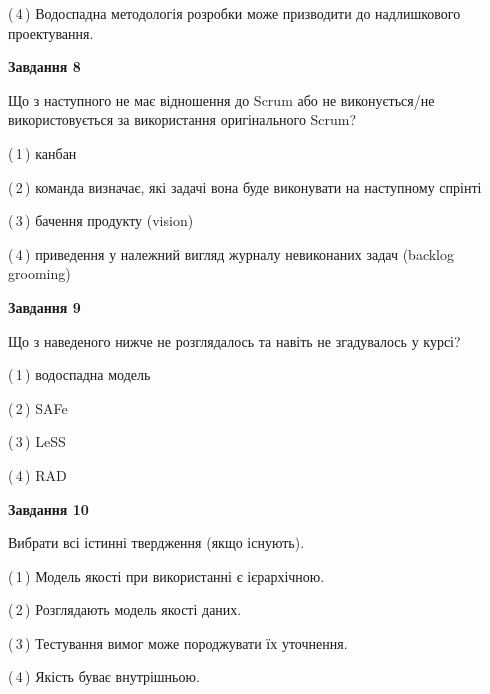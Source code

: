 \documentclass[10pt, ukrainian]{article}
\begin{document}
{\begin {large}
(\,4\,) Водоспадна методологія розробки може призводити до надлишкового проектування. %


{\begin {center}\textbf{Завдання 8}\end {center}}\par
Що з наступного не має відношення до Scrum або не виконується/не використовується за використання оригінального Scrum?\par
\vspace{2mm}



(\,1\,) канбан%



(\,2\,) команда визначає, які задачі вона буде виконувати на наступному спрінті%



(\,3\,) бачення продукту (vision) %



(\,4\,) приведення у належний вигляд журналу невиконаних задач (backlog grooming) %


{\begin {center}\textbf{Завдання 9}\end {center}}\par
Що з наведеного нижче не розглядалось та навіть не згадувалось у курсі?\par
\vspace{2mm}



(\,1\,) водоспадна модель%



(\,2\,) SAFe%



(\,3\,) LeSS%



(\,4\,) RAD%


{\begin {center}\textbf{Завдання 10}\end {center}}\par
Вибрати всі істинні твердження (якщо існують).\par
\vspace{2mm}



(\,1\,) Модель якості при використанні є ієрархічною.%



(\,2\,) Розглядають модель якості даних.%



(\,3\,) Тестування вимог може породжувати їх уточнення.%



(\,4\,) Якість буває внутрішньою.%



\end {large}}
\end{document}
